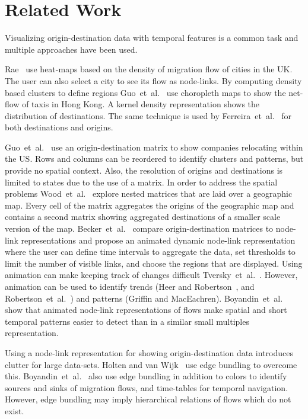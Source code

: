\documentclass[a4paper,twocolumn]{article}
\author{Josua Krause}
\begin{document}
\section*{Related Work}
Visualizing origin-destination data with temporal features
is a common task and multiple approaches have been used.

Rae~\cite{Rae2009} use heat-maps based on
the density of migration flow of cities in the UK.
The user can also select a city to see its flow as node-links.
By computing density based clusters to define regions
Guo~et~al.~\cite{Guo2012} use choropleth maps to show
the net-flow of taxis in Hong Kong.
A kernel density representation shows the distribution
of destinations.
The same technique is used by Ferreira~et~al.~\cite{Ferreira2013}
for both destinations and origins.

Guo~et~al.~\cite{Guo2006} use an origin-destination matrix
to show companies relocating within the US.
Rows and columns can be reordered to identify clusters
and patterns, but provide no spatial context.
Also, the resolution of origins and destinations is limited
to states due to the use of a matrix.
In order to address the spatial problems
Wood~et~al.~\cite{Wood2002} explore nested matrices
that are laid over a geographic map.
Every cell of the matrix aggregates the origins
of the geographic map and contains
a second matrix showing aggregated destinations of
a smaller scale version of the map.
Becker~et~al.~\cite{Becker1995} compare
origin-destination matrices to node-link representations
and propose an animated dynamic node-link representation
where the user can define time intervals to aggregate the data,
set thresholds to limit the number of visible links,
and choose the regions that are displayed.
Using animation can make keeping track of changes
difficult Tversky~et~al.~\cite{Tversky2002}.
However, animation can be used to
identify trends (Heer and Robertson~\cite{Heer2007},
and Robertson~et~al.~\cite{Robertson}) and
patterns (Griffin and MacEachren\cite{Griffin2006}).
Boyandin~et~al.~\cite{Boyandin2012} show that animated
node-link representations of flows make spatial and short temporal
patterns easier to detect than in
a similar small multiples representation.

Using a node-link representation for showing origin-destination
data introduces clutter for large data-sets.
Holten and van Wijk~\cite{Holten2009} use edge bundling to overcome this.
Boyandin~et~al.~\cite{Boyandin2008} also use edge bundling
in addition to colors to identify sources and sinks of migration
flows, and time-tables for temporal navigation.
However, edge bundling may imply hierarchical
relations of flows which do not exist.
\end{document}
